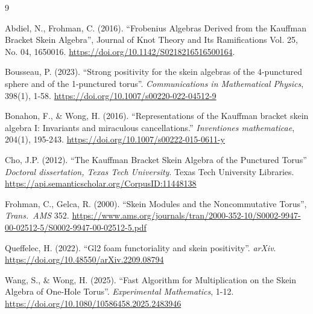 \documentclass[12pt]{article}
\begin{document}
\begin{thebibliography}{9}

Abdiel, N., Frohman, C. (2016). ``Frobenius Algebras Derived from the Kauffman Bracket Skein Algebra'',  Journal of Knot Theory and Its Ramifications Vol. 25, No. 04, 1650016. 
\url{https://doi.org/10.1142/S0218216516500164}.


Bousseau, P. (2023). ``Strong positivity for the skein algebras of the 4-punctured sphere and of the 1-punctured torus''. \emph{Communications in Mathematical Physics}, 398(1), 1-58. \url{https://doi.org/10.1007/s00220-022-04512-9}





Bonahon, F., \& Wong, H. (2016). ``Representations of the Kauffman bracket skein algebra I: Invariants and miraculous cancellations.'' \emph{Inventiones mathematicae}, 204(1), 195-243. \url{https://doi.org/10.1007/s00222-015-0611-y}

Cho, J.P. (2012). ``The Kauffman Bracket Skein Algebra of the Punctured Torus'' \emph{Doctoral dissertation, Texas Tech University}. Texas Tech University Libraries. \url{https://api.semanticscholar.org/CorpusID:11448138}


Frohman, C., Gelca, R. (2000). ``Skein Modules and the Noncommutative Torus'', \emph{Trans.\ AMS} 352. \url{https://www.ams.org/journals/tran/2000-352-10/S0002-9947-00-02512-5/S0002-9947-00-02512-5.pdf}

Queffelec, H. (2022). ``Gl2 foam functoriality and skein positivity''. \emph{arXiv}. \url{https://doi.org/10.48550/arXiv.2209.08794}

Wang, S., \& Wong, H. (2025). ``Fast Algorithm for Multiplication on the Skein Algebra of One-Hole Torus''. \emph{Experimental Mathematics}, 1-12. \url{https://doi.org/10.1080/10586458.2025.2483946}


\end{thebibliography}
\end{document}
